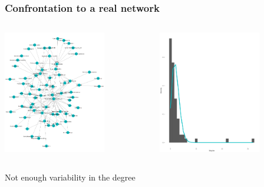 \documentclass[compress,10pt]{beamer}
\begin{document}
\begin{frame}\frametitle{Confrontation to a real network}
\begin{columns}
\begin{column}{0.5\textwidth}
\centering
\includegraphics[width=0.7\textwidth]{plots/network_Herlzier(NC)}
\end{column}
\begin{column}{0.5\textwidth}
\centering
\includegraphics[width=0.7\textwidth]{plots/degree_Herlzier(NC)}
\end{column}
\end{columns}


\bigskip
\centering

 
\centering
Not enough variability in the degree
\end{frame}
\end{document}
